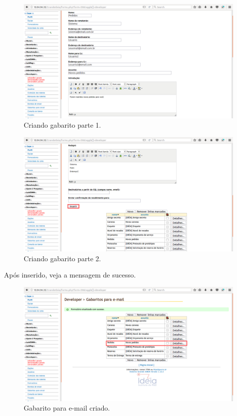 \documentclass[9pt]{report}
\begin{document}
{      \begin{figure}[H]
        \includegraphics[width=\textwidth]{2_Formularios/6_Envio_de_email/60.png}
        \caption{Criando gabarito parte 1.}
        \label{fig:criandogabaritosemail1}
      \end{figure}

      \begin{figure}[H]
        \includegraphics[width=\textwidth]{2_Formularios/6_Envio_de_email/61.png}
        \caption{Criando gabarito parte 2.}
        \label{fig:criandogabaritosemail2}
      \end{figure}

      Após inserido, veja a mensagem de sucesso.

      \begin{figure}[H]
        \includegraphics[width=\textwidth]{2_Formularios/6_Envio_de_email/62.png}
        \caption{Gabarito para e-mail criado.}
        \label{fig:gabaritoscriado}
      \end{figure}

}
\end{document}
